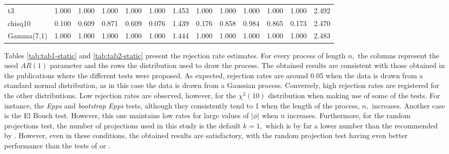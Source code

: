 \begin{table}[!h]
{\begin{tabular}[t]{lrrrrrrrrrrrr}
\hspace{1em}t3 & 1.000 & 1.000 & 1.000 & 1.000 & 1.000 & 1.453 & 1.000 & 1.000 & 1.000 & 1.000 & 1.000 & 2.492\\
\hspace{1em}chisq10 & 0.100 & 0.609 & 0.871 & 0.609 & 0.076 & 1.439 & 0.176 & 0.858 & 0.984 & 0.865 & 0.173 & 2.470\\
\hspace{1em}Gamma(7,1) & 1.000 & 1.000 & 1.000 & 1.000 & 1.000 & 1.444 & 1.000 & 1.000 & 1.000 & 1.000 & 1.000 & 2.483\\
\bottomrule
\end{tabular}}
\end{table}

Tables \ref{tab:tab1-static} and \ref{tab:tab2-static} present the rejection rate estimates. For every process of length \(n,\) the columns represent the used \(AR(1)\) parameter and the rows the distribution used to draw the process. The obtained results are consistent with those obtained in the publications where the different tests were proposed. As expected, rejection rates are around 0.05 when the data is drawn from a standard normal distribution, as in this case the data is drawn from a Gaussian process. Conversely, high rejection rates are registered for the other distributions. Low rejection rates are observed, however, for the \(\chi^2(10)\) distribution when making use of some of the tests. For instance, the \emph{Epps} and \emph{bootstrap Epps} tests, although they consistently tend to 1 when the length of the process, \(n,\) increases. Another case is the El Bouch test. However, this one maintains low rates for large values of \(|\phi|\) when \(n\) increases. Furthermore, for the random projections test, the number of projections used in this study is the default \(k = 1,\) which is by far a lower number than the recommended by \citet{nietoreyes2014}. However, even in these conditions, the obtained results are satisfactory, with the random projection test having even better performance than the tests of \citet{epps1987} or \citet{vavra2017}.


